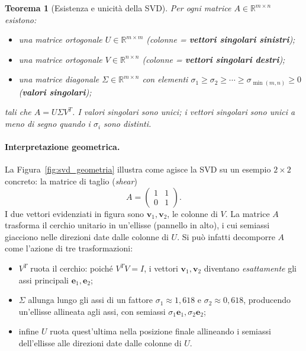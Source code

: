 \documentclass[11pt,a4paper]{article}
\theoremstyle{plain}
\newtheorem{teorema}{Teorema}[section]
\theoremstyle{definition}
\theoremstyle{remark}
\begin{document}
\begin{teorema}[Esistenza e unicità della SVD]
\label{thm:svd}
Per ogni matrice $A \in \mathbb{R}^{m \times n}$ esistono:
\begin{itemize}
  \item una matrice ortogonale $U \in \mathbb{R}^{m \times m}$ (colonne = \textbf{vettori singolari sinistri});
  \item una matrice ortogonale $V \in \mathbb{R}^{n \times n}$ (colonne = \textbf{vettori singolari destri});
  \item una matrice diagonale $\Sigma \in \mathbb{R}^{m \times n}$ con elementi
        $\sigma_1 \geq \sigma_2 \geq \cdots \geq \sigma_{\min(m,n)} \geq 0$
        (\textbf{valori singolari});
\end{itemize}
tali che $A = U \Sigma V^T$. I valori singolari sono unici; i vettori singolari
sono unici a meno di segno quando i $\sigma_i$ sono distinti.
\end{teorema}

\paragraph{Interpretazione geometrica.}
La Figura~\ref{fig:svd_geometria} illustra come agisce la SVD su un esempio
$2\times 2$ concreto: la matrice di taglio (\emph{shear})
\begin{equation}
A = \begin{pmatrix}1&1\\0&1\end{pmatrix}.
  \label{eq:esempio_shear}
\end{equation}
I due vettori evidenziati in figura sono
$\mathbf{v}_1, \mathbf{v}_2$, le colonne di $V$. 
La matrice $A$ trasforma il cerchio unitario in
un'ellisse (pannello in alto), i cui semiassi giacciono nelle direzioni date dalle colonne di $U$.
Si può infatti decomporre $A$ come l'azione di tre trasformazioni:
\begin{itemize}
\item $V^T$ ruota il cerchio: poiché $V^TV = I$, i vettori $\mathbf{v}_1,
      \mathbf{v}_2$ diventano \emph{esattamente} gli assi principali
      $\mathbf{e}_1, \mathbf{e}_2$;
\item $\Sigma$ allunga lungo gli assi di un fattore $\sigma_1 \approx
      1{,}618$ e $\sigma_2 \approx 0{,}618$, producendo un'ellisse allineata
      agli assi, con semiassi $\sigma_1\mathbf{e}_1, \sigma_2\mathbf{e}_2$;
\item infine $U$ ruota quest'ultima nella posizione finale allineando i semiassi dell'ellisse alle direzioni date dalle colonne di $U$.
\end{itemize}
\end{document}
